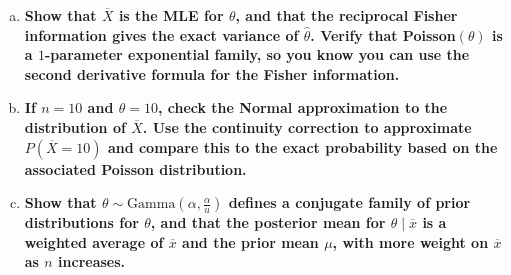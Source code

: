 \documentclass[11pt]{article}
\begin{document}
\begin{enumerate}
\begin{enumerate}[a)]
        \item \textbf{Show that $\overline{X}$ is the MLE for $\theta$, and that the reciprocal Fisher information gives the exact variance of $\hat{\theta}$. 
        Verify that Poisson$(\theta)$ is a $1$-parameter exponential family, so you know you can use the second derivative formula for the Fisher information.}

        \item \textbf{If $n = 10$ and $\theta = 10$, check the Normal approximation to the distribution of $\overline{X}$. Use the continuity
        correction to approximate $P(\overline{X} = 10)$ and compare this to the exact probability based on the associated Poisson distribution.}

        \item \textbf{Show that $\theta \sim \mathrm{Gamma}\left( \alpha, \frac{\alpha}{u} \right)$ defines a conjugate family of prior distributions for $\theta$, and that the
        posterior mean for $\theta \mid \overline{x}$ is a weighted average of $\overline{x}$ and the prior mean $\mu$, with more weight on $\overline{x}$ as $n$ increases.}

    \end{enumerate}
    
\end{enumerate}
\end{document}
